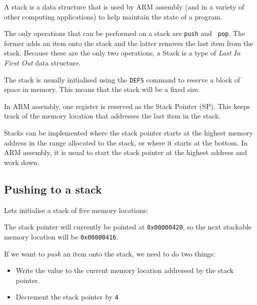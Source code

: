 A stack is a data structure that is used by ARM assembly (and in a variety of
other computing applications) to help maintain the state of a program.


The only operations that can be performed on a stack are {\tt push} and {\tt
pop}. The former adds an item onto the stack and the latter removes the last
item from the stack. Because these are the only two operations, a Stack is a
type of {\it Last In First Out} data structure.

The stack is usually initialised using the {\tt DEFS} command to reserve a block
of space in memory. This means that the stack will be a fixed size.

In ARM assembly, one register is reserved as the Stack Pointer (SP). This keeps
track of the memory location that addresses the last item in the stack.

Stacks can be implemented where the stack pointer starts at the highest memory
address in the range allocated to the stack, or where it starts at the bottom.
In ARM assembly, it is usual to start the stack pointer at the highest address
and work down.

\subsection{Pushing to a stack}

Lets initialise a stack of five memory locations:

\begin{center}
\begin{drawstack}
		
		
		
		
		
\end{drawstack}
\end{center}

The stack pointer will currently be pointed at {\tt 0x00000420}, so the next
stackable memory location will be {\tt 0x00000416}.

If we want to {\it push} an item onto the stack, we need to do two things:

\begin{itemize}

	\item Write the value to the current memory location addressed by the stack
	pointer.

	\item Decrement the stack pointer by {\tt 4}

\end{itemize}


